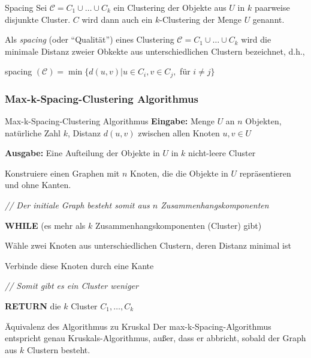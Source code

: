 \documentclass{panikzettel}
\newcommand\tab[1][1cm]{\hspace*{#1}}
\newcommand{\boxspace}{	\vspace{-\baselineskip}	}
\begin{document}
{\begin{defi}{Spacing}
	Sei $\mathcal{C} = C_1 \cup \dots \cup C_k$ ein Clustering der Objekte aus $U$ in $k$ paarweise disjunkte Cluster. $C$ wird dann auch ein $k$-Clustering der Menge $U$ genannt.
	
	Als \emph{spacing} (oder ``Qualität'') eines Clustering $\mathcal{C} = C_1 \cup \dots \cup C_k$ wird die minimale Distanz zweier Obkekte aus unterschiedlichen Clustern bezeichnet, d.h.,
	
	\centering spacing $(\mathcal{C}) = \min \{d(u,v) | u \in C_i, v \in C_j,$ für $i \neq j \}$
\end{defi}


\subsubsection{Max-k-Spacing-Clustering Algorithmus}

\begin{algo}{Max-k-Spacing-Clustering Algorithmus}
	\textbf{Eingabe:} Menge $U$ an $n$ Objekten, natürliche Zahl $k$, Distanz $d(u,v)$ zwischen allen Knoten $u,v \in U$
	
	\textbf{Ausgabe:} Eine Aufteilung der Objekte in $U$ in $k$ nicht-leere Cluster
	
	\tcblower
	
	Konstruiere einen Graphen mit $n$ Knoten, die die Objekte in $U$ repräsentieren und ohne Kanten.
	
	\textit{ \color{gray} // Der initiale Graph besteht somit aus $n$ Zusammenhangskomponenten }
	
	\textbf{WHILE} (es mehr als $k$ Zusammenhangskomponenten (Cluster) gibt)
	
	\tab Wähle zwei Knoten aus unterschiedlichen Clustern, deren Distanz minimal ist
	
	\tab Verbinde diese Knoten durch eine Kante
	
	\tab \textit{ \color{gray} // Somit gibt es ein Cluster weniger }
	
	\textbf{RETURN} die $k$ Cluster $C_1, \dots, C_k$
\end{algo}

\begin{halfboxl}
	\boxspace
	
	\begin{theo}{Äquivalenz des Algorithmus zu Kruskal}
		Der max-k-Spacing-Algorithmus entspricht genau Kruskals-Algorithmus, außer, dass er abbricht, sobald der Graph aus $k$ Clustern besteht.
		

\end{theo}
\end{halfboxl}}
\end{document}
